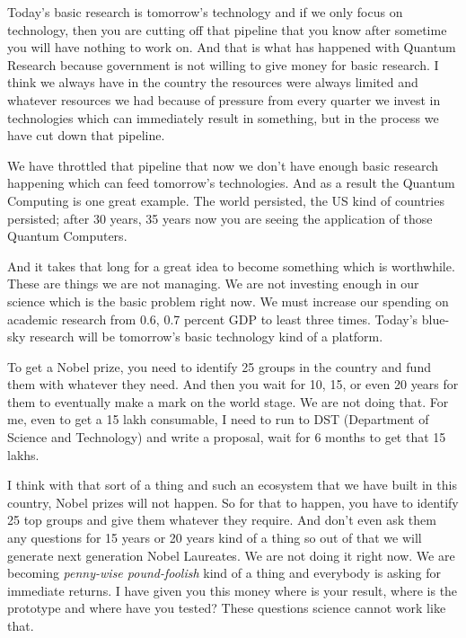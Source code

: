\begin{multicols}{2}
Today’s basic research is tomorrow’s technology and if we only focus on technology, then you are cutting off that pipeline that you know after sometime you will have nothing to work on. And that is what has happened with Quantum Research because government is not willing to give money for basic research. I think we always have in the country the resources were always limited and whatever resources we had because of pressure from every quarter we invest in technologies which can immediately result in something, but in the process we have cut down that pipeline.

We have throttled that pipeline that now we don’t have enough basic research happening which can feed tomorrow’s technologies. And as a result the Quantum Computing is one great example. The world persisted, the US kind of countries persisted; after 30 years, 35 years now you are seeing the application of those Quantum Computers.

And it takes that long for a great idea to become something which is worthwhile. These are things we are not managing. We are not investing enough in our science which is the basic problem right now. We must increase our spending on academic research from 0.6, 0.7 percent GDP to least three times. Today’s blue-sky research will be tomorrow’s basic technology kind of a platform.

To get a Nobel prize, you need to identify 25 groups in the country and fund them with whatever they need. And then you wait for 10, 15, or even 20 years for them to eventually make a mark on the world stage. We are not doing that. For me, even to get a 15 lakh consumable, I need to run to DST (Department of Science and Technology) and write a proposal, wait for 6 months to get that 15 lakhs.

I think with that sort of a thing and such an ecosystem that we have built in this country, Nobel prizes will not happen. So for that to happen, you have to identify 25 top groups and give them whatever they require. And don’t even ask them any questions for 15 years or 20 years kind of a thing so out of that we will generate next generation Nobel Laureates. We are not doing it right now. We are becoming \textit{penny-wise pound-foolish} kind of a thing and everybody is asking for immediate returns. I have given you this money where is your result, where is the prototype and where have you tested? These questions science cannot work like that. 
\end{multicols}
